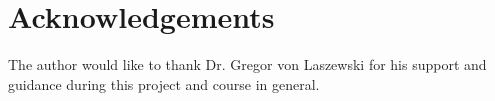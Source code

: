 \documentclass{article}
\begin{document}
\section{Acknowledgements}
The author would like to thank Dr. Gregor von Laszewski for his support and guidance during this project and course in general.



\end{document}
